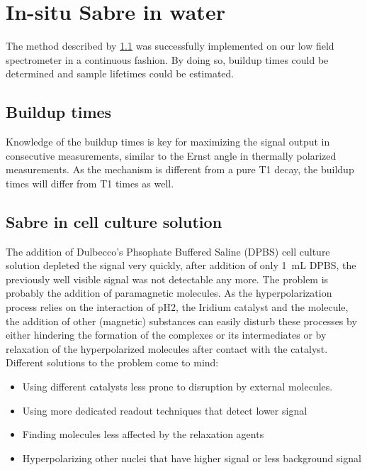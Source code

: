    \section{In-situ Sabre in water}
            The method described by \ref{} was successfully implemented on our low field spectrometer in a continuous fashion. By doing so, buildup times could be determined and sample lifetimes could be estimated.
        \subsection{Buildup times}
            Knowledge of the buildup times is key for maximizing the signal output in consecutive measurements, similar to the Ernst angle in thermally polarized measurements. As the mechanism is different from a pure T1 decay, the buildup times will differ from T1 times as well.
        \subsection{Sabre in cell culture solution}
        \label{sec:discussion:cellSolution}
        The addition of Dulbecco's Phsophate Buffered Saline (DPBS) cell culture solution depleted the signal very quickly, after addition of only \SI{1}{\milli\liter} DPBS, the previously well visible signal was not detectable any more. The problem is probably the addition of paramagnetic molecules. As the hyperpolarization process relies on the interaction of pH2, the Iridium catalyst and the molecule, the addition of other (magnetic) substances can easily disturb these processes by either hindering the formation of the complexes or its intermediates or by relaxation of the hyperpolarized molecules after contact with the catalyst. Different solutions to the problem come to mind: 
            \begin{itemize}
            \setlength{\itemsep}{-7pt}
                \item Using different catalysts less prone to disruption by external molecules.
                \item Using more dedicated readout techniques that detect lower signal
                \item Finding molecules less affected by the relaxation agents
                \item Hyperpolarizing other nuclei that have higher signal or less background signal
            \end{itemize}
